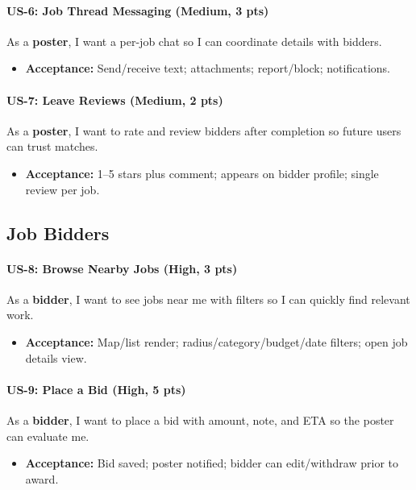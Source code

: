 \documentclass[11pt]{article}
\begin{document}
\paragraph{US-6: Job Thread Messaging (Medium, 3 pts)}
As a \textbf{poster}, I want a per-job chat so I can coordinate details with bidders.
\begin{itemize}[leftmargin=1.4em]
  \item \textbf{Acceptance:} Send/receive text; attachments; report/block; notifications.
\end{itemize}

\paragraph{US-7: Leave Reviews (Medium, 2 pts)}
As a \textbf{poster}, I want to rate and review bidders after completion so future users can trust matches.
\begin{itemize}[leftmargin=1.4em]
  \item \textbf{Acceptance:} 1–5 stars plus comment; appears on bidder profile; single review per job.
\end{itemize}

\subsection*{Job Bidders}
\paragraph{US-8: Browse Nearby Jobs (High, 3 pts)}
As a \textbf{bidder}, I want to see jobs near me with filters so I can quickly find relevant work.
\begin{itemize}[leftmargin=1.4em]
  \item \textbf{Acceptance:} Map/list render; radius/category/budget/date filters; open job details view.
\end{itemize}

\paragraph{US-9: Place a Bid (High, 5 pts)}
As a \textbf{bidder}, I want to place a bid with amount, note, and ETA so the poster can evaluate me.
\begin{itemize}[leftmargin=1.4em]
  \item \textbf{Acceptance:} Bid saved; poster notified; bidder can edit/withdraw prior to award.
\end{itemize}
\end{document}
